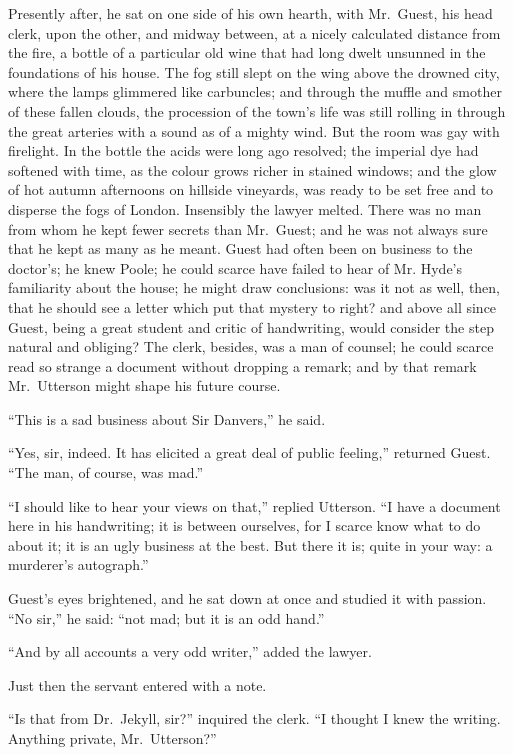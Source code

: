 \documentclass[12pt,openright]{book}
\begin{document}
Presently after, he sat on one side of his own hearth, with Mr. Guest, his head clerk, upon the other, and midway between, at a nicely calculated distance from the fire, a bottle of a particular old wine that had long dwelt unsunned in the foundations of his house. The fog still slept on the wing above the drowned city, where the lamps glimmered like carbuncles; and through the muffle and smother of these fallen clouds, the procession of the town’s life was still rolling in through the great arteries with a sound as of a mighty wind. But the room was gay with firelight. In the bottle the acids were long ago resolved; the imperial dye had softened with time, as the colour grows richer in stained windows; and the glow of hot autumn afternoons on hillside vineyards, was ready to be set free and to disperse the fogs of London. Insensibly the lawyer melted. There was no man from whom he kept fewer secrets than Mr. Guest; and he was not always sure that he kept as many as he meant. Guest had often been on business to the doctor’s; he knew Poole; he could scarce have failed to hear of Mr. Hyde’s familiarity about the house; he might draw conclusions: was it not as well, then, that he should see a letter which put that mystery to right? and above all since Guest, being a great student and critic of handwriting, would consider the step natural and obliging? The clerk, besides, was a man of counsel; he could scarce read so strange a document without dropping a remark; and by that remark Mr. Utterson might shape his future course.

“This is a sad business about Sir Danvers,” he said.

“Yes, sir, indeed. It has elicited a great deal of public feeling,” returned Guest. “The man, of course, was mad.”

“I should like to hear your views on that,” replied Utterson. “I have a document here in his handwriting; it is between ourselves, for I scarce know what to do about it; it is an ugly business at the best. But there it is; quite in your way: a murderer’s autograph.”

Guest’s eyes brightened, and he sat down at once and studied it with passion. “No sir,” he said: “not mad; but it is an odd hand.”

“And by all accounts a very odd writer,” added the lawyer.

Just then the servant entered with a note.

“Is that from Dr. Jekyll, sir?” inquired the clerk. “I thought I knew the writing. Anything private, Mr. Utterson?”
\end{document}
